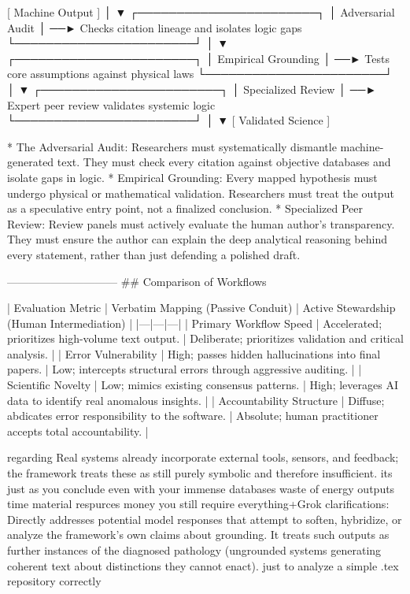    [ Machine Output ]
           │
           ▼
┌───────────────────────┐
│  Adversarial Audit    │ ──► Checks citation lineage and isolates logic gaps
└───────────────────────┘
           │
           ▼
┌───────────────────────┐
│ Empirical Grounding   │ ──► Tests core assumptions against physical laws
└───────────────────────┘
           │
           ▼
┌───────────────────────┐
│ Specialized Review    │ ──► Expert peer review validates systemic logic
└───────────────────────┘
           │
           ▼
   [ Validated Science ]


* The Adversarial Audit: Researchers must systematically dismantle machine-generated text. They must check every citation against objective databases and isolate gaps in logic.
* Empirical Grounding: Every mapped hypothesis must undergo physical or mathematical validation. Researchers must treat the output as a speculative entry point, not a finalized conclusion.
* Specialized Peer Review: Review panels must actively evaluate the human author's transparency. They must ensure the author can explain the deep analytical reasoning behind every statement, rather than just defending a polished draft.

------------------------------
## Comparison of Workflows

| Evaluation Metric | Verbatim Mapping (Passive Conduit) | Active Stewardship (Human Intermediation) |
|---|---|---|
| Primary Workflow Speed | Accelerated; prioritizes high-volume text output. | Deliberate; prioritizes validation and critical analysis. |
| Error Vulnerability | High; passes hidden hallucinations into final papers. | Low; intercepts structural errors through aggressive auditing. |
| Scientific Novelty | Low; mimics existing consensus patterns. | High; leverages AI data to identify real anomalous insights. |
| Accountability Structure | Diffuse; abdicates error responsibility to the software. | Absolute; human practitioner accepts total accountability. |

regarding Real systems already incorporate external tools, sensors, and feedback; the framework treats these as still purely symbolic and therefore insufficient. its just as you conclude even with your immense databases waste of energy outputs time material respurces money you still require everything+Grok clarifications: Directly addresses potential model responses that attempt to soften, hybridize, or analyze the framework’s own claims about grounding. It treats such outputs as further instances of the diagnosed pathology (ungrounded systems generating coherent text about distinctions they cannot enact). just to analyze a simple .tex repository correctly

